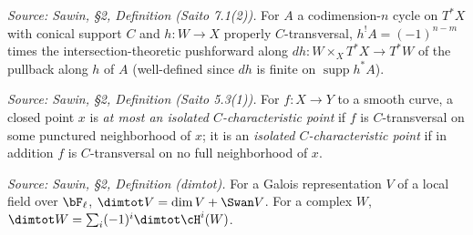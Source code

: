 \begin{definition}
  \label{def:sawin_shriek_pullback}
  \textit{Source: Sawin, §2, Definition (Saito 7.1(2)).}
  For $A$ a codimension-$n$ cycle on $T^*X$ with conical support $C$ and $h:W\to
  X$ properly $C$-transversal, $h^!A = (-1)^{n-m}$ times the
  intersection-theoretic pushforward along $dh:W\times_X T^*X\to T^*W$ of the
  pullback along $h$ of $A$ (well-defined since $dh$ is finite on $\operatorname{supp} h^*A$).
\end{definition}

\begin{definition}
  \label{def:sawin_isolated_char_point}
  \textit{Source: Sawin, §2, Definition (Saito 5.3(1)).}
  For $f:X\to Y$ to a smooth curve, a closed point $x$ is \emph{at most an
  isolated $C$-characteristic point} if $f$ is $C$-transversal on some punctured
  neighborhood of $x$; it is an \emph{isolated $C$-characteristic point} if in
  addition $f$ is $C$-transversal on no full neighborhood of $x$.
\end{definition}

\begin{definition}
  \label{def:sawin_dimtot}
  \textit{Source: Sawin, §2, Definition (dimtot).}
  For a Galois representation $V$ of a local field over $\bF_\ell$,
  $\dimtot V = \dim V + \Swan V$.  For a complex $W$,
  $\dimtot W = \sum_i (-1)^i \dimtot \cH^i(W)$.
\end{definition}

